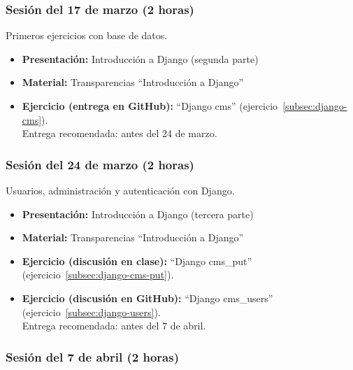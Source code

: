 \documentclass[a4paper,12pt]{article}
\begin{document}
\subsubsection{Sesión del 17 de marzo (2 horas)}

Primeros ejercicios con base de datos.

\begin{itemize}
 \item \textbf{Presentación:} Introducción a Django (segunda parte)
 \item \textbf{Material:} Transparencias ``Introducción a Django''

 \item \textbf{Ejercicio  (entrega en GitHub):} ``Django cms'' (ejercicio~\ref{subsec:django-cms}). \\
    Entrega recomendada: antes del 24 de marzo.
 
\end{itemize}

\subsubsection{Sesión del 24 de marzo (2 horas)}

Usuarios, administración y autenticación con Django.

\begin{itemize}
 \item \textbf{Presentación:} Introducción a Django (tercera parte)
 \item \textbf{Material:} Transparencias ``Introducción a Django''
  \item \textbf{Ejercicio (discusión en clase):} ``Django cms\_put'' (ejercicio~\ref{subsec:django-cms-put}).
 \item \textbf{Ejercicio (discusión en GitHub):} ``Django cms\_users'' (ejercicio~\ref{subsec:django-users}). \\
 Entrega recomendada: antes del 7 de abril.
\end{itemize}


\subsubsection{Sesión del 7 de abril (2 horas)}
\end{document}
